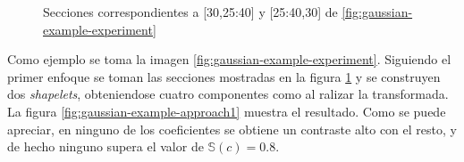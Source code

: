 \begin{figure}
	\centering
	\caption{ Secciones correspondientes a [30,25:40] y [25:40,30] de \ref{fig:gaussian-example-experiment}} \label{fig:lines-experiment}
\end{figure}

Como ejemplo se toma la imagen \ref{fig:gaussian-example-experiment}. Siguiendo el primer enfoque se toman las 
secciones mostradas en la figura
\ref{fig:lines-experiment} y se construyen dos \textit{shapelets}, obteniendose cuatro componentes como 
al ralizar la transformada. La figura \ref{fig:gaussian-example-approach1} muestra el resultado. Como se puede apreciar, en ninguno de 
los coeficientes se obtiene un contraste alto con el resto, y de hecho ninguno supera el valor de $\mathbb{S}(c)=0.8$.

